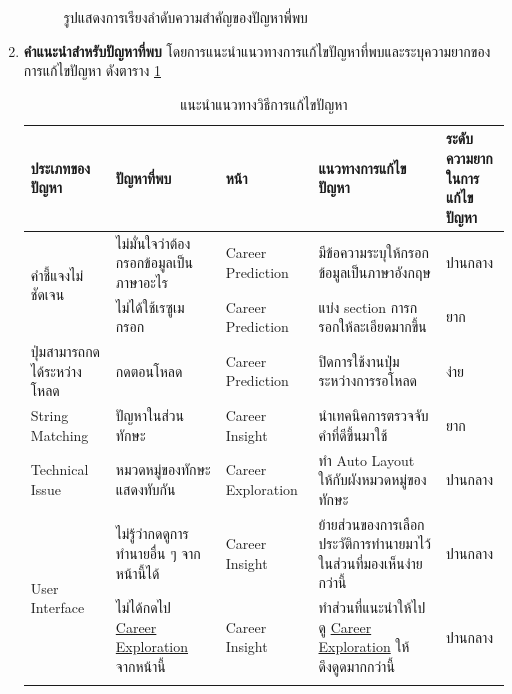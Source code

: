 \begin{enumerate}
\begin{figure}[H]
              \caption{รูปแสดงการเรียงลำดับความสำคัญของปัญหาพี่พบ}\label{fig:PrioritizeUT}
          \end{figure}
    \item \textbf{คำแนะนำสำหรับปัญหาที่พบ} โดยการแนะนำแนวทางการแก้ไขปัญหาที่พบและระบุความยากของการแก้ไขปัญหา ดังตาราง \ref{tab:recommendationsUT}
          \begin{table}[H]
              \caption{แนะนำแนวทางวิธีการแก้ไขปัญหา}
              \label{tab:recommendationsUT}
              \begin{tabularx}{\textwidth}{|l|>{\raggedright\arraybackslash}X|l|>{\raggedright\arraybackslash}X|>{\raggedright\arraybackslash}X|}
                  \hline
                  \textbf{ประเภทของปัญหา}             & \textbf{ปัญหาที่พบ}                    & \textbf{หน้า}       & \textbf{แนวทางการแก้ไขปัญหา}                          & \textbf{ระดับความยากในการแก้ไขปัญหา} \\ \hline
                  \multirow[t]{2}{*}{คำชี้แจงไม่ชัดเจน}   & ไม่มั่นใจว่าต้องกรอกข้อมูลเป็นภาษาอะไร      & Career Prediction  & มีข้อความระบุให้กรอกข้อมูลเป็นภาษาอังกฤษ                    & ปานกลาง                           \\ \cline{2-5}
                                                     & ไม่ได้ใช้เรซูเมกรอก                     & Career Prediction  & แบ่ง section การกรอกให้ละเอียดมากขึ้น                    & ยาก                               \\ \hline
                  ปุ่มสามารถกดได้ระหว่างโหลด             & กดตอนโหลด                           & Career Prediction  & ปิดการใช้งานปุ่มระหว่างการรอโหลด                         & ง่าย                               \\ \hline
                  String Matching                    & ปัญหาในส่วนทักษะ                       & Career Insight     & นำเทคนิคการตรวจจับคำที่ดีขึ้นมาใช้                            & ยาก                               \\ \hline
                  Technical Issue                    & หมวดหมู่ของทักษะแสดงทับกัน               & Career Exploration & ทำ Auto Layout ให้กับผังหมวดหมู่ของทักษะ                   & ปานกลาง                           \\ \hline
                  \multirow[t]{3}{*}{User Interface} & ไม่รู้ว่ากดดูการทำนายอื่น ๆ จากหน้านี้ได้       & Career Insight     & ย้ายส่วนของการเลือกประวัติการทำนายมาไว้ในส่วนที่มองเห็นง่ายกว่านี้ & ปานกลาง                           \\ \cline{2-5}
                                                     & ไม่ได้กดไป \hyperref[subsec:Career Exploration]{Career Exploration} จากหน้านี้ & Career Insight     & ทำส่วนที่แนะนำให้ไปดู \hyperref[subsec:Career Exploration]{Career Exploration} ให้ดึงดูดมากกว่านี้                 & ปานกลาง                           \\ \cline{2-5}

\end{tabularx}
\end{table}
\end{enumerate}
